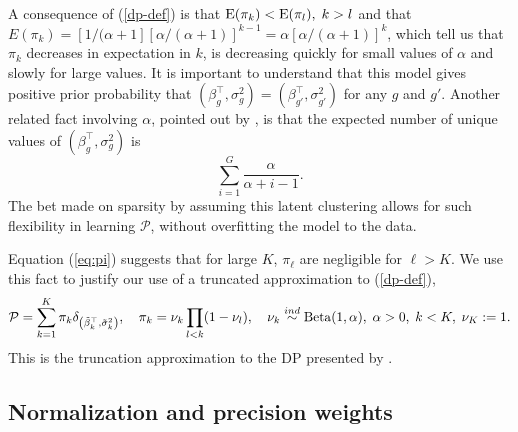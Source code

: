 A consequence of (\ref{dp-def}) is that $\operatorname{E}(\pi_k)<\operatorname{E}(\pi_l),\;k>l$ and that $E(\pi_k)=\left[1/(\alpha+1\right]\left[\alpha/(\alpha+1)\right]^{k-1} = \alpha \left[\alpha/(\alpha+1)\right]^{k}$, which tell us that $\pi_k$ decreases in expectation in $k$, is decreasing quickly for small values of $\alpha$ and slowly for large values. It is important to understand that this model gives positive prior probability that $(\beta_g^\top,\sigma_g^2)=(\beta_{g'}^\top,\sigma_{g'}^2)$ for any $g$ and $g'$. Another related fact involving $\alpha$, pointed out by \citet{antoniak}, is that the expected number of unique values of $(\beta_g^\top,\sigma^2_g)$ is 
\begin{equation}
\label{exp-num-clust}
\sum_{i=1}^G \frac{\alpha}{\alpha + i - 1}.
\end{equation}  The bet made on sparsity by assuming this latent clustering allows for such flexibility in learning $\mathcal{P}$, without overfitting the model to the data.

Equation (\ref{eq:pi}) suggests that for large $K$, $\pi_\ell$ are negligible for $\ell>K$. We use this fact to justify our use of a truncated approximation to (\ref{dp-def}),
\begin{equation}
\label{trunc-dp-def}
\mathcal{P} =\sum_{k=1}^K \pi_k \delta_{\left(\tilde{\beta}_k^\top ,\tilde{\sigma}^2_k\right)},\quad \pi_k = \nu_k \prod_{l<k}(1-\nu_l), \quad 
\nu_k \stackrel{ind}{\sim} \operatorname{Beta}(1, \alpha),\; \alpha>0,\; k<K,\; \nu_K:=1.
\end{equation}
This is the truncation approximation to the DP presented by \citet{ishwaran2000}.
%
%
%

\subsection{Normalization and precision weights}
\label{norm-weight}
